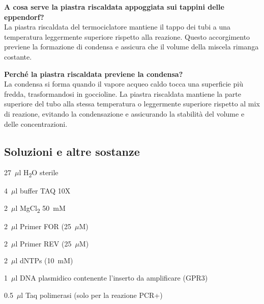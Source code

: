 \begin{percheBox}
    \textbf{A cosa serve la piastra riscaldata appoggiata sui tappini delle eppendorf?} \\
    La piastra riscaldata del termociclatore mantiene il tappo dei tubi a una temperatura leggermente superiore rispetto alla reazione. Questo accorgimento previene la formazione di condensa e assicura che il volume della miscela rimanga costante.
\end{percheBox}

\begin{percheBox}
    \textbf{Perché la piastra riscaldata previene la condensa?} \\
    La condensa si forma quando il vapore acqueo caldo tocca una superficie più fredda, trasformandosi in goccioline. La piastra riscaldata mantiene la parte superiore del tubo alla stessa temperatura o leggermente superiore rispetto al mix di reazione, evitando la condensazione e assicurando la stabilità del volume e delle concentrazioni.
\end{percheBox}


\subsection{Soluzioni e altre sostanze}
\begin{itemize}
\footnotesize{
      \item 27~$\mu$l H\textsubscript{2}O sterile
    \item 4~$\mu$l buffer TAQ 10X
    \item 2~$\mu$l MgCl\textsubscript{2} 50~mM
    \item 2~$\mu$l Primer FOR (25~$\mu$M)
    \item 2~$\mu$l Primer REV (25~$\mu$M)
    \item 2~$\mu$l dNTPs (10~mM)
    \item 1~$\mu$l DNA plasmidico contenente l’inserto da amplificare (GPR3)
    \item 0.5~$\mu$l Taq polimerasi (solo per la reazione PCR+)
}
\end{itemize}

